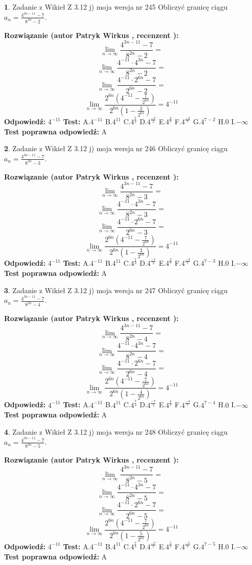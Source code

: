\documentclass[12pt, a4paper]{article}
\theoremstyle{definition} %
\newtheorem{zad}{}
\newcommand{\zadStart}[1]{\begin{zad}#1\newline}
\newcommand{\zadStop}{\end{zad}}
\newcommand{\rozwStart}[2]{\noindent \textbf{Rozwiązanie (autor #1 , recenzent #2): }\newline}
\newcommand{\rozwStop}{\newline}
\newcommand{\odpStart}{\noindent \textbf{Odpowiedź:}\newline}
\newcommand{\odpStop}{\newline}
\newcommand{\testStart}{\noindent \textbf{Test:}\newline}
\newcommand{\testStop}{\newline}
\newcommand{\kluczStart}{\noindent \textbf{Test poprawna odpowiedź:}\newline}
\newcommand{\kluczStop}{\newline}
\begin{document}
\zadStart{Zadanie z Wikieł Z 3.12 j) moja wersja nr 245}
Obliczyć granicę ciągu $a_{n}=\frac{4^{3n-11}-7}{8^{2n}-2}$.
\zadStop
\rozwStart{Patryk Wirkus}{}
$$\lim\limits_{n\to\infty}\frac{4^{3n-11}-7}{8^{2n}-2}=$$
$$\lim\limits_{n\to\infty}\frac{4^{-11} \cdot 4^{3n}-7}{8^{2n}-2}=$$
$$\lim\limits_{n\to\infty}\frac{4^{-11} \cdot 2^{6n}-7}{2^{6n}-2}=$$
$$\lim\limits_{n\to\infty}\frac{2^{6n}(4^{-11} - \frac{7}{2^{6n}})}{2^{6n}(1-\frac{2}{2^{6n}})}= 4^{-11}$$
\rozwStop
\odpStart
$4^{-11}$
\odpStop
\testStart
A.$4^{-11}$
B.$4^{11}$
C.$4^{\frac{7}{2}}$
D.$4^{\frac{-7}{2}}$
E.$4^{\frac{2}{7}}$
F.$4^{\frac{-2}{7}}$
G.$4^{7-2}$
H.$0$
I.$-\infty$
\testStop
\kluczStart
A
\kluczStop



\zadStart{Zadanie z Wikieł Z 3.12 j) moja wersja nr 246}
Obliczyć granicę ciągu $a_{n}=\frac{4^{3n-11}-7}{8^{2n}-3}$.
\zadStop
\rozwStart{Patryk Wirkus}{}
$$\lim\limits_{n\to\infty}\frac{4^{3n-11}-7}{8^{2n}-3}=$$
$$\lim\limits_{n\to\infty}\frac{4^{-11} \cdot 4^{3n}-7}{8^{2n}-3}=$$
$$\lim\limits_{n\to\infty}\frac{4^{-11} \cdot 2^{6n}-7}{2^{6n}-3}=$$
$$\lim\limits_{n\to\infty}\frac{2^{6n}(4^{-11} - \frac{7}{2^{6n}})}{2^{6n}(1-\frac{3}{2^{6n}})}= 4^{-11}$$
\rozwStop
\odpStart
$4^{-11}$
\odpStop
\testStart
A.$4^{-11}$
B.$4^{11}$
C.$4^{\frac{7}{3}}$
D.$4^{\frac{-7}{3}}$
E.$4^{\frac{3}{7}}$
F.$4^{\frac{-3}{7}}$
G.$4^{7-3}$
H.$0$
I.$-\infty$
\testStop
\kluczStart
A
\kluczStop



\zadStart{Zadanie z Wikieł Z 3.12 j) moja wersja nr 247}
Obliczyć granicę ciągu $a_{n}=\frac{4^{3n-11}-7}{8^{2n}-4}$.
\zadStop
\rozwStart{Patryk Wirkus}{}
$$\lim\limits_{n\to\infty}\frac{4^{3n-11}-7}{8^{2n}-4}=$$
$$\lim\limits_{n\to\infty}\frac{4^{-11} \cdot 4^{3n}-7}{8^{2n}-4}=$$
$$\lim\limits_{n\to\infty}\frac{4^{-11} \cdot 2^{6n}-7}{2^{6n}-4}=$$
$$\lim\limits_{n\to\infty}\frac{2^{6n}(4^{-11} - \frac{7}{2^{6n}})}{2^{6n}(1-\frac{4}{2^{6n}})}= 4^{-11}$$
\rozwStop
\odpStart
$4^{-11}$
\odpStop
\testStart
A.$4^{-11}$
B.$4^{11}$
C.$4^{\frac{7}{4}}$
D.$4^{\frac{-7}{4}}$
E.$4^{\frac{4}{7}}$
F.$4^{\frac{-4}{7}}$
G.$4^{7-4}$
H.$0$
I.$-\infty$
\testStop
\kluczStart
A
\kluczStop



\zadStart{Zadanie z Wikieł Z 3.12 j) moja wersja nr 248}
Obliczyć granicę ciągu $a_{n}=\frac{4^{3n-11}-7}{8^{2n}-5}$.
\zadStop
\rozwStart{Patryk Wirkus}{}
$$\lim\limits_{n\to\infty}\frac{4^{3n-11}-7}{8^{2n}-5}=$$
$$\lim\limits_{n\to\infty}\frac{4^{-11} \cdot 4^{3n}-7}{8^{2n}-5}=$$
$$\lim\limits_{n\to\infty}\frac{4^{-11} \cdot 2^{6n}-7}{2^{6n}-5}=$$
$$\lim\limits_{n\to\infty}\frac{2^{6n}(4^{-11} - \frac{7}{2^{6n}})}{2^{6n}(1-\frac{5}{2^{6n}})}= 4^{-11}$$
\rozwStop
\odpStart
$4^{-11}$
\odpStop
\testStart
A.$4^{-11}$
B.$4^{11}$
C.$4^{\frac{7}{5}}$
D.$4^{\frac{-7}{5}}$
E.$4^{\frac{5}{7}}$
F.$4^{\frac{-5}{7}}$
G.$4^{7-5}$
H.$0$
I.$-\infty$
\testStop
\kluczStart
A
\kluczStop
\end{document}
